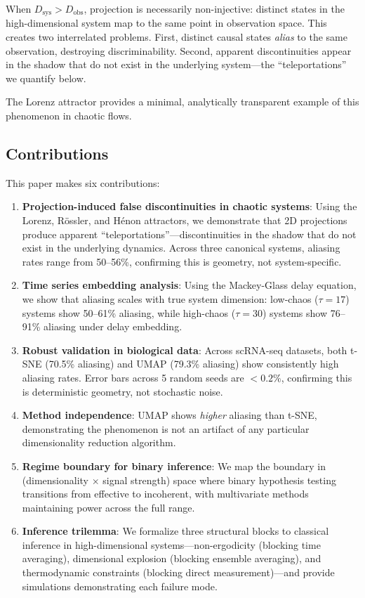 \documentclass[12pt]{article}
\begin{document}
When $D_{\text{sys}} > D_{\text{obs}}$, projection is necessarily non-injective: distinct states in the high-dimensional system map to the same point in observation space. This creates two interrelated problems. First, distinct causal states \emph{alias} to the same observation, destroying discriminability. Second, apparent discontinuities appear in the shadow that do not exist in the underlying system---the ``teleportations'' we quantify below.

The Lorenz attractor provides a minimal, analytically transparent example of this phenomenon in chaotic flows.

\subsection{Contributions}

This paper makes six contributions:

\begin{enumerate}
    \item \textbf{Projection-induced false discontinuities in chaotic systems}: Using the Lorenz, Rössler, and Hénon attractors, we demonstrate that 2D projections produce apparent ``teleportations''---discontinuities in the shadow that do not exist in the underlying dynamics. Across three canonical systems, aliasing rates range from 50--56\%, confirming this is geometry, not system-specific.

    \item \textbf{Time series embedding analysis}: Using the Mackey-Glass delay equation, we show that aliasing scales with true system dimension: low-chaos ($\tau = 17$) systems show 50--61\% aliasing, while high-chaos ($\tau = 30$) systems show 76--91\% aliasing under delay embedding.

    \item \textbf{Robust validation in biological data}: Across scRNA-seq datasets, both t-SNE (70.5\% aliasing) and UMAP (79.3\% aliasing) show consistently high aliasing rates. Error bars across 5 random seeds are $<0.2\%$, confirming this is deterministic geometry, not stochastic noise.

    \item \textbf{Method independence}: UMAP shows \emph{higher} aliasing than t-SNE, demonstrating the phenomenon is not an artifact of any particular dimensionality reduction algorithm.

    \item \textbf{Regime boundary for binary inference}: We map the boundary in (dimensionality $\times$ signal strength) space where binary hypothesis testing transitions from effective to incoherent, with multivariate methods maintaining power across the full range.

    \item \textbf{Inference trilemma}: We formalize three structural blocks to classical inference in high-dimensional systems---non-ergodicity (blocking time averaging), dimensional explosion (blocking ensemble averaging), and thermodynamic constraints (blocking direct measurement)---and provide simulations demonstrating each failure mode.
\end{enumerate}
\end{document}

